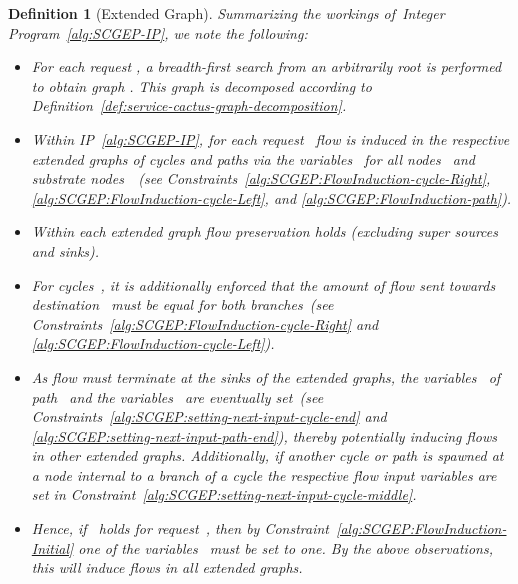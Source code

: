 \documentclass[10pt, conference, letterpaper]{IEEEtran}
\newtheorem{definition}[theorem]{Definition}
\begin{document}
\begin{definition}[Extended Graph]
Summarizing the workings of~Integer Program~\ref{alg:SCGEP-IP}, we note the following:
\begin{itemize}
\item For each request , a breadth-first search from an arbitrarily root  is performed to obtain graph . This graph is decomposed according to Definition~\ref{def:service-cactus-graph-decomposition}.
\item Within IP~\ref{alg:SCGEP-IP}, for each request~ flow is induced in the respective extended graphs of cycles and paths via the variables~ for all nodes~ and substrate nodes~~(see Constraints~\ref{alg:SCGEP:FlowInduction-cycle-Right}, \ref{alg:SCGEP:FlowInduction-cycle-Left}, and \ref{alg:SCGEP:FlowInduction-path}).
\item Within each extended graph flow preservation holds (excluding super sources and sinks).
\item For cycles~, it is additionally enforced that the amount of flow sent towards destination~ must be equal for both branches~(see Constraints~\ref{alg:SCGEP:FlowInduction-cycle-Right} and \ref{alg:SCGEP:FlowInduction-cycle-Left}).
\item As flow must terminate at the sinks of the extended graphs, the variables~ of path~ and the variables~ are eventually set~(see Constraints~\ref{alg:SCGEP:setting-next-input-cycle-end} and \ref{alg:SCGEP:setting-next-input-path-end}), thereby potentially inducing flows in other extended graphs. Additionally, if another cycle or path is spawned at a node internal to a branch of a cycle the respective flow input variables  are set in  Constraint~\ref{alg:SCGEP:setting-next-input-cycle-middle}.
\item Hence, if~ holds for request~, then by Constraint~\ref{alg:SCGEP:FlowInduction-Initial} one of the variables~ must be set to one. By the above observations, this will induce flows in \emph{all} extended graphs. 
\end{itemize}




{

 
}
\end{definition}
\end{document}

